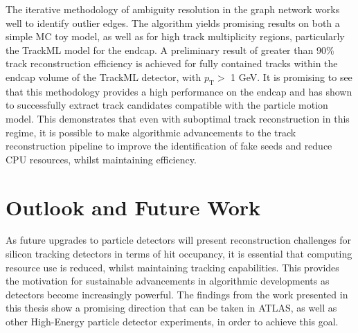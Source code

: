 The iterative methodology of ambiguity resolution in the graph network works well to identify outlier edges. The algorithm yields promising results on both a simple MC toy model, as well as for high track multiplicity regions, particularly the TrackML model for the endcap. A preliminary result of greater than 90\% track reconstruction efficiency is achieved for fully contained tracks within the endcap volume of the TrackML detector, with $p_{\text{T}} >$ 1 GeV. It is promising to see that this methodology provides a high performance on the endcap and has shown to successfully extract track candidates compatible with the particle motion model. This demonstrates that even with suboptimal track reconstruction in this regime, it is possible to make algorithmic advancements to the track reconstruction pipeline to improve the identification of fake seeds and reduce CPU resources, whilst maintaining efficiency. 


\section{Outlook and Future Work}

As future upgrades to particle detectors will present reconstruction challenges for silicon tracking detectors in terms of hit occupancy, it is essential that computing resource use is reduced, whilst maintaining tracking capabilities. This provides the motivation for sustainable advancements in algorithmic developments as detectors become increasingly powerful. The findings from the work presented in this thesis show a promising direction that can be taken in ATLAS, as well as other High-Energy particle detector experiments, in order to achieve this goal. 
